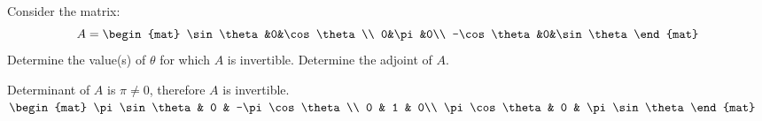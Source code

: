 
\begin{Exercise}[
name={},
title={}, 
difficulty=0,
origin={\cite{YL}}]
Consider the matrix:
\[
A=\begin{mat}
\sin\theta&0&\cos\theta\\
0&\pi&0\\
-\cos\theta&0&\sin\theta
\end{mat}
\]
\Question Determine the value(s) of $\theta$ for which $A$ is invertible.
\Question Determine the adjoint of $A$.
\end{Exercise}

\begin{Answer}
\Question Determinant of $A$ is $\pi\neq0$, therefore $A$ is invertible.
\Question $\begin{mat}
\pi\sin\theta & 0 & -\pi\cos\theta\\
0 & 1 & 0\\
\pi\cos\theta & 0 & \pi\sin\theta
\end{mat}$
\end{Answer}
